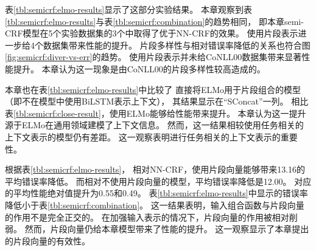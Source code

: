 表\ref{tbl:semicrf:elmo-results}显示了这部分实验结果。
本章观察到表\ref{tbl:semicrf:elmo-results}与表\ref{tbl:semicrf:combination}的趋势相同，
即本章semi-CRF模型在5个实验数据集的3个中取得了优于NN-CRF的效果。
使用片段表示进一步给4个数据集带来性能的提升。
片段多样性与相对错误率降低的关系也符合图\ref{fig:semicrf:diver-vs-err}的趋势。
使用片段表示并未给CoNLL00数据集带来显著性能提升。
本章认为这一现象是由CoNLL00的片段多样性较高造成的。

本章也在表\ref{tbl:semicrf:elmo-results}中比较了
直接将ELMo用于片段组合的模型（即不在模型中使用BiLSTM表示上下文），
其结果显示在``SConcat''一列。
相比表\ref{tbl:semicrf:close-result}，使用ELMo能够给性能带来提升。
本章认为这一提升源于ELMo在通用领域建模了上下文信息。
然而，这一结果相较使用任务相关的上下文表示的模型仍有差距。
这一观察表明进行任务相关的上下文表示的重要性。

根据表\ref{tbl:semicrf:elmo-results}，
相对NN-CRF，使用片段向量能够带来13.16的平均错误率降低。
而相对不使用片段向量的模型，平均错误率降低是12.00。
对应的平均性能绝对值提升为0.55和0.49。
表\ref{tbl:semicrf:elmo-results}中显示的错误率降低小于表\ref{tbl:semicrf:combination}。
这一结果表明，输入组合函数与片段向量的作用不是完全正交的。
在加强输入表示的情况下，片段向量的作用被相对削弱。
然而，片段向量仍给本章模型带来了性能的提升。
这一观察显示了本章提出的片段向量的有效性。

